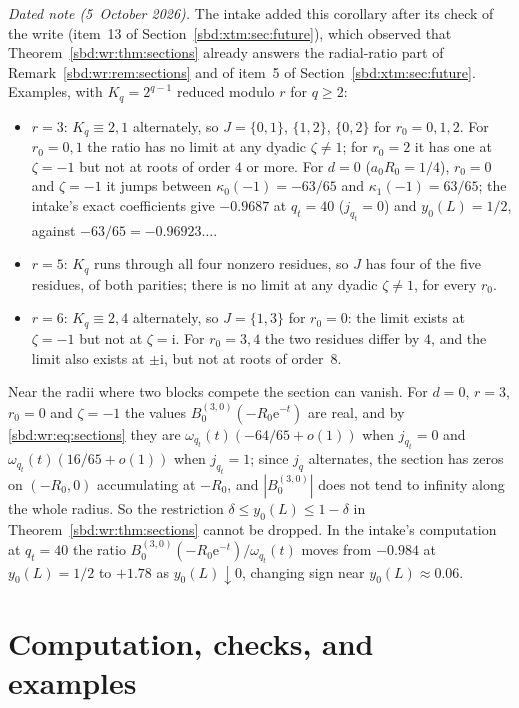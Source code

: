 \documentclass[11pt,a4paper]{article}
\theoremstyle{definition}
\newcommand{\e}{\mathrm e}
\newcommand{\ii}{\mathrm i}
\begin{document}
\emph{Dated note (5~October 2026).} The intake added this corollary after
its check of the write (item~13 of Section~\ref{sbd:xtm:sec:future}), which
observed that Theorem~\ref{sbd:wr:thm:sections} already answers the
radial-ratio part of Remark~\ref{sbd:wr:rem:sections} and of item~5 of
Section~\ref{sbd:xtm:sec:future}. Examples, with $K_q=2^{q-1}$ reduced
modulo $r$ for $q\ge2$:
\begin{itemize}[leftmargin=*,nosep]
\item $r=3$: $K_q\equiv2,1$ alternately, so $J=\{0,1\}$, $\{1,2\}$, $\{0,2\}$
for $r_0=0,1,2$. For $r_0=0,1$ the ratio has no limit at any dyadic
$\zeta\ne1$; for $r_0=2$ it has one at $\zeta=-1$ but not at roots of order
$4$ or more. For $d=0$ ($a_0R_0=1/4$), $r_0=0$ and $\zeta=-1$ it jumps
between $\kappa_0(-1)=-63/65$ and $\kappa_1(-1)=63/65$; the intake's exact
coefficients give $-0.9687$ at $q_t=40$ ($j_{q_t}=0$) and $y_0(L)=1/2$,
against $-63/65=-0.96923\ldots$.
\item $r=5$: $K_q$ runs through all four nonzero residues, so $J$ has four of
the five residues, of both parities; there is no limit at any dyadic
$\zeta\ne1$, for every $r_0$.
\item $r=6$: $K_q\equiv2,4$ alternately, so $J=\{1,3\}$ for $r_0=0$: the
limit exists at $\zeta=-1$ but not at $\zeta=\ii$. For $r_0=3,4$ the two
residues differ by $4$, and the limit also exists at $\pm\ii$, but not at
roots of order~$8$.
\end{itemize}
Near the radii where two blocks compete the section can vanish. For $d=0$,
$r=3$, $r_0=0$ and $\zeta=-1$ the values $B_0^{(3,0)}(-R_0\e^{-t})$ are
real, and by \eqref{sbd:wr:eq:sections} they are
$\omega_{q_t}(t)(-64/65+o(1))$ when $j_{q_t}=0$ and
$\omega_{q_t}(t)(16/65+o(1))$ when $j_{q_t}=1$; since $j_q$ alternates, the
section has zeros on $(-R_0,0)$ accumulating at $-R_0$, and
$|B_0^{(3,0)}|$ does not tend to infinity along the whole radius. So the
restriction $\delta\le y_0(L)\le1-\delta$ in
Theorem~\ref{sbd:wr:thm:sections} cannot be dropped. In the intake's
computation at $q_t=40$ the ratio $B_0^{(3,0)}(-R_0\e^{-t})/\omega_{q_t}(t)$
moves from $-0.984$ at $y_0(L)=1/2$ to $+1.78$ as $y_0(L)\downarrow0$,
changing sign near $y_0(L)\approx0.06$.

\section{Computation, checks, and examples}
\label{sbd:xtm:sec:computation}
\end{document}
